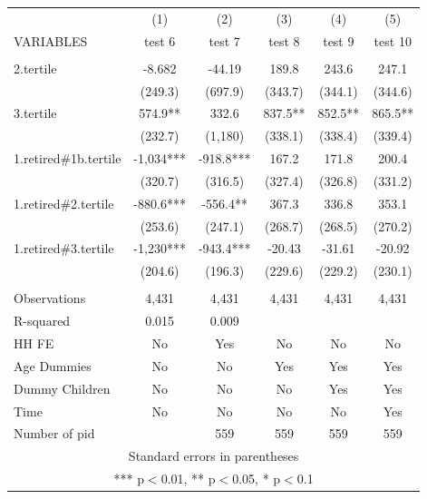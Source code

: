 \begin{tabular}{lccccc} \hline
 & (1) & (2) & (3) & (4) & (5) \\
VARIABLES & test 6 & test 7 & test 8 & test 9 & test 10 \\ \hline
 &  &  &  &  &  \\
2.tertile & -8.682 & -44.19 & 189.8 & 243.6 & 247.1 \\
 & (249.3) & (697.9) & (343.7) & (344.1) & (344.6) \\
3.tertile & 574.9** & 332.6 & 837.5** & 852.5** & 865.5** \\
 & (232.7) & (1,180) & (338.1) & (338.4) & (339.4) \\
1.retired\#1b.tertile & -1,034*** & -918.8*** & 167.2 & 171.8 & 200.4 \\
 & (320.7) & (316.5) & (327.4) & (326.8) & (331.2) \\
1.retired\#2.tertile & -880.6*** & -556.4** & 367.3 & 336.8 & 353.1 \\
 & (253.6) & (247.1) & (268.7) & (268.5) & (270.2) \\
1.retired\#3.tertile & -1,230*** & -943.4*** & -20.43 & -31.61 & -20.92 \\
 & (204.6) & (196.3) & (229.6) & (229.2) & (230.1) \\
 &  &  &  &  &  \\
Observations & 4,431 & 4,431 & 4,431 & 4,431 & 4,431 \\
R-squared & 0.015 & 0.009 &  &  &  \\
HH FE & No & Yes & No & No & No \\
Age Dummies & No & No & Yes & Yes & Yes \\
Dummy Children & No & No & No & Yes & Yes \\
Time & No & No & No & No & Yes \\
 Number of pid &  & 559 & 559 & 559 & 559 \\ \hline
\multicolumn{6}{c}{ Standard errors in parentheses} \\
\multicolumn{6}{c}{ *** p$<$0.01, ** p$<$0.05, * p$<$0.1} \\
\end{tabular}
